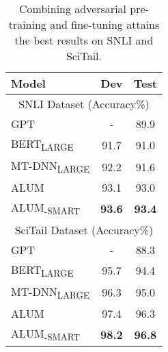 \documentclass[11pt,a4paper]{article}
\newcommand{\alumrobertalarge}{ALUM}
\begin{document}
\begin{table}[htb!]
	\begin{center}
		\begin{tabular}{@{\hskip1pt}l | c | c @{\hskip1pt}}
	\toprule    
	
	   \bf Model &Dev& Test  \\ \hline 
		\multicolumn{3}{c}{ SNLI Dataset (Accuracy\%)}  \\ \hline 
		GPT \cite{gpt22019} &- & 89.9 \\ \hline
		BERT\textsubscript{LARGE} &91.7& 91.0\\ \hline		
		MT-DNN\textsubscript{LARGE}\cite{liu2019mt-dnn}&92.2& 91.6\\ \hline		
{\alumrobertalarge{}} &93.1& 93.0\\ \hline
{\alumrobertalarge{}}\textsubscript{-SMART} &\textbf{93.6}& \textbf{93.4}\\ \hline
		\hline		
		\multicolumn{3}{c}{ SciTail Dataset (Accuracy\%)}  \\ \hline
		GPT \cite{gpt22019} &- &88.3 \\ \hline
		BERT\textsubscript{LARGE}\cite{liu2019mt-dnn} &95.7& 94.4\\ \hline		
		MT-DNN\textsubscript{LARGE}\cite{liu2019mt-dnn} &96.3& 95.0\\ \hline
		{\alumrobertalarge{}} &97.4 & 96.3\\ \hline
{\alumrobertalarge{}}\textsubscript{-SMART} & \textbf{98.2}&\textbf{96.8} \\
		\bottomrule
		\end{tabular}
	\end{center}
	\caption{Combining adversarial pre-training and fine-tuning attains the best results on SNLI and SciTail. }
	\label{tab:snli}
\end{table}
\end{document}
